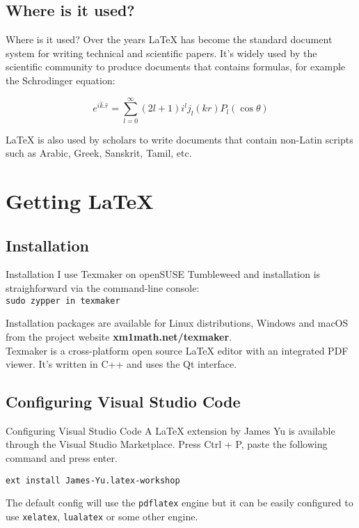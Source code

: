 \documentclass[aspectratio=169]{beamer}
\begin{document}
\subsection{Where is it used?}
\begin{frame}{Where is it used?}
  Over the years {\LaTeX} has become the standard document system for writing technical and scientific papers. It's widely used by the scientific community to produce documents that contains formulas, for example the Schrodinger equation:

  \begin{equation*}
    e^{i\hat{k}.\hat{r}}=\sum\limits_{l=0}^{\infty }\left( 2l+1\right)
    i^{l}j_{l}\left( kr\right) P_{l}\left( \cos \theta \right) 
  \end{equation*}

  {\LaTeX} is also used by scholars to write documents that contain non-Latin scripts such as Arabic, Greek, Sanskrit, Tamil, etc.

\end{frame}

\section{Getting {\LaTeX}}
\subsection{Installation}
\begin{frame}{Installation}
  I use Texmaker on openSUSE Tumbleweed and installation is straighforward via the command-line console:\\

    {\tt \vspace{0.5em}\hspace{8ex}sudo zypper in texmaker}
  
  Installation packages are available for Linux distributions, Windows and macOS from the project website {\bf xm1math.net/texmaker}.\\
  
  {\vspace{1em} Texmaker is a cross-platform open source {\LaTeX} editor with an integrated PDF viewer. It's written in C++ and uses the Qt interface.}
\end{frame}

\subsection{Configuring Visual Studio Code}
\begin{frame}{Configuring Visual Studio Code}
  A {\LaTeX} extension by James Yu is available through the Visual Studio Marketplace. Press Ctrl + P, paste the following command and press enter.
  \begin{center}
    {\tt ext install James-Yu.latex-workshop}
  \end{center}

  The default config will use the {\tt pdflatex} engine but it can be easily configured to use {\tt xelatex}, {\tt lualatex} or some other engine.
\end{frame}
\end{document}
